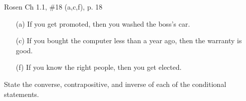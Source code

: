 \documentclass[12pt]{exam}
\newenvironment{my_parts}{
\begin{parts}
    \setlength{\itemsep}{1pt}
    \setlength{\parskip}{0pt}
    \setlength{\parsep}{0pt}
}{\end{parts}}
\begin{document}
\begin{questions}
\question[6] Rosen Ch 1.1, \#18 (a,c,f), p. 18
    \begin{solution}
        \begin{itemize}
        \item[(a)] If you get promoted, then you washed the boss's car.
        \item[(c)] If you bought the computer less than a year ago, then the warranty is good.
        \item[(f)] If you know the right people, then you get elected.
        \end{itemize}
    \end{solution}

\question[6] State the converse, contrapositive, and inverse of each of the conditional statements.
    \begin{solution}
\end{solution}
\end{questions}
\end{document}
